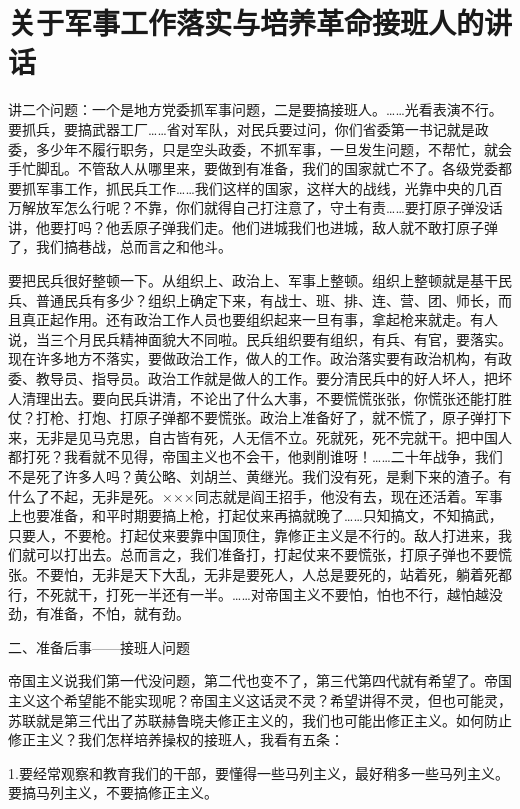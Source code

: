 \section[关于军事工作落实与培养革命接班人的讲话（一九六四年六月十六日于十三陵）]{关于军事工作落实与培养革命接班人的讲话}


讲二个问题：一个是地方党委抓军事问题，二是要搞接班人。……光看表演不行。要抓兵，要搞武器工厂……省对军队，对民兵要过问，你们省委第一书记就是政委，多少年不履行职务，只是空头政委，不抓军事，一旦发生问题，不帮忙，就会手忙脚乱。不管敌人从哪里来，要做到有准备，我们的国家就亡不了。各级党委都要抓军事工作，抓民兵工作……我们这样的国家，这样大的战线，光靠中央的几百万解放军怎么行呢？不靠，你们就得自己打注意了，守土有责……要打原子弹没话讲，他要打吗？他丢原子弹我们走。他们进城我们也进城，敌人就不敢打原子弹了，我们搞巷战，总而言之和他斗。

要把民兵很好整顿一下。从组织上、政治上、军事上整顿。组织上整顿就是基干民兵、普通民兵有多少？组织上确定下来，有战士、班、排、连、营、团、师长，而且真正起作用。还有政治工作人员也要组织起来一旦有事，拿起枪来就走。有人说，当三个月民兵精神面貌大不同啦。民兵组织要有组织，有兵、有官，要落实。现在许多地方不落实，要做政治工作，做人的工作。政治落实要有政治机构，有政委、教导员、指导员。政治工作就是做人的工作。要分清民兵中的好人坏人，把坏人清理出去。要向民兵讲清，不论出了什么大事，不要慌慌张张，你慌张还能打胜仗？打枪、打炮、打原子弹都不要慌张。政治上准备好了，就不慌了，原子弹打下来，无非是见马克思，自古皆有死，人无信不立。死就死，死不完就干。把中国人都打死？我看就不见得，帝国主义也不会干，他剥削谁呀！……二十年战争，我们不是死了许多人吗？黄公略、刘胡兰、黄继光。我们没有死，是剩下来的渣子。有什么了不起，无非是死。×××同志就是阎王招手，他没有去，现在还活着。军事上也要准备，和平时期要搞上枪，打起仗来再搞就晚了……只知搞文，不知搞武，只要人，不要枪。打起仗来要靠中国顶住，靠修正主义是不行的。敌人打进来，我们就可以打出去。总而言之，我们准备打，打起仗来不要慌张，打原子弹也不要慌张。不要怕，无非是天下大乱，无非是要死人，人总是要死的，站着死，躺着死都行，不死就干，打死一半还有一半。……对帝国主义不要怕，怕也不行，越怕越没劲，有准备，不怕，就有劲。

二、准备后事——接班人问题

帝国主义说我们第一代没问题，第二代也变不了，第三代第四代就有希望了。帝国主义这个希望能不能实现呢？帝国主义这话灵不灵？希望讲得不灵，但也可能灵，苏联就是第三代出了苏联赫鲁晓夫修正主义的，我们也可能出修正主义。如何防止修正主义？我们怎样培养操权的接班人，我看有五条：

1.要经常观察和教育我们的干部，要懂得一些马列主义，最好稍多一些马列主义。要搞马列主义，不要搞修正主义。

